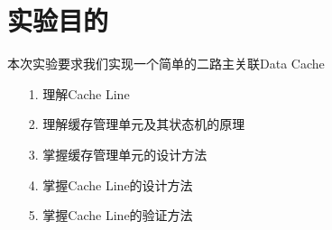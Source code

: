 \section{实验目的}
本次实验要求我们实现一个简单的二路主关联Data Cache
\begin{itemize}
    \item [1.] 理解Cache Line
    \item [2.] 理解缓存管理单元及其状态机的原理
    \item [3.] 掌握缓存管理单元的设计方法
    \item [4.] 掌握Cache Line的设计方法
    \item [5.] 掌握Cache Line的验证方法
\end{itemize}    